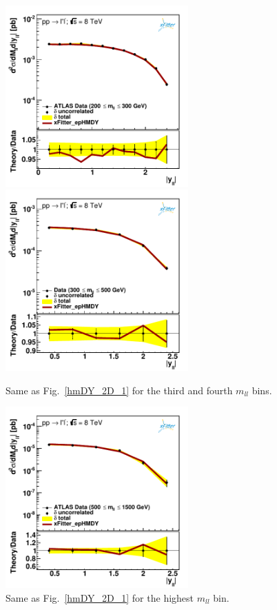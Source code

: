 \begin{figure}[t]
\centering
\includegraphics[width=7cm]{figs/data_403-1.pdf}
\includegraphics[width=7cm]{figs/data_404-1.pdf}
\caption{Same as Fig.~\ref{hmDY_2D_1} for the third and fourth $m_{ll}$ bins.
}
\label{hmDY_2D_2}
\end{figure}

\begin{figure}[t]
\centering
\includegraphics[width=7cm]{figs/data_405-1.pdf}
\caption{Same as Fig.~\ref{hmDY_2D_1} for the highest $m_{ll}$ bin.
}
\label{hmDY_2D_3}
\end{figure}

